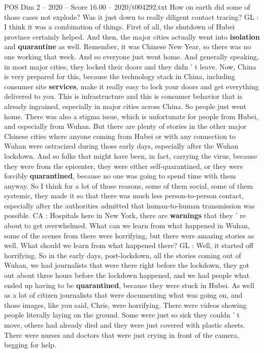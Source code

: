 \begin{textsample}{POS Dim 2 – 2020 – Score 16.00 – 2020/t004292.txt}
How on earth did some of those cases not explode?
Was it just down to really diligent contact tracing?
GL : I think it was a combination of things.
First of all, the shutdown of Hubei province certainly helped.
And then, the major cities actually went into \textbf{isolation} and \textbf{quarantine} as well.
Remember, it was Chinese New Year, so there was no one working that week.
And so everyone just went home.
And generally speaking, in most major cities, they locked their doors and they didn ' t leave.
Now, China is very prepared for this, because the technology stack in China, including consumer site \textbf{services}, make it really easy to lock your doors and get everything delivered to you.
This is infrastructure and this is consumer behavior that is already ingrained, especially in major cities across China.
So people just went home.
There was also a stigma issue, which is unfortunate for people from Hubei, and especially from Wuhan.
But there are plenty of stories in the other major Chinese cities where anyone coming from Hubei or with any connection to Wuhan were ostracized during those early days, especially after the Wuhan lockdown.
And so folks that might have been, in fact, carrying the virus, because they were from the epicenter, they were either self-quarantined, or they were forcibly \textbf{quarantined}, because no one was going to spend time with them anyway.
So I think for a lot of those reasons, some of them social, some of them systemic, they made it so that there was much less person-to-person contact, especially after the authorities admitted that human-to-human transmission was possible.
CA : Hospitals here in New York, there are \textbf{warnings} that they ' re about to get overwhelmed.
What can we learn from what happened in Wuhan, some of the scenes from there were horrifying, but there were amazing stories as well.
What should we learn from what happened there?
GL : Well, it started off horrifying.
So in the early days, post-lockdown, all the stories coming out of Wuhan, we had journalists that were there right before the lockdown, they got out about three hours before the lockdown happened, and we had people what ended up having to be \textbf{quarantined}, because they were stuck in Hubei.
As well as a lot of citizen journalists that were documenting what was going on, and those images, like you said, Chris, were horrifying.
There were videos showing people literally laying on the ground.
Some were just so sick they couldn ' t move, others had already died and they were just covered with plastic sheets.
There were nurses and doctors that were just crying in front of the camera, begging for help.

\end{textsample}
